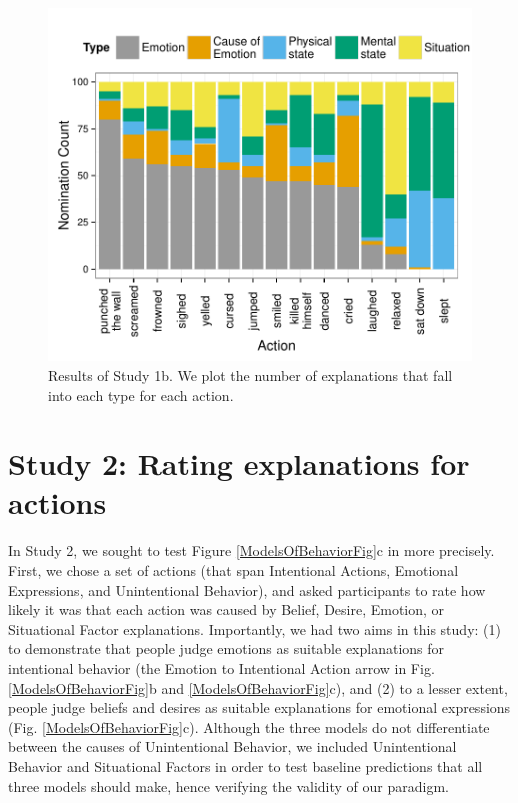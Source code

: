 \documentclass[10pt,letterpaper]{article}
\begin{document}
\begin{figure}[htb!]
\begin{center}\includegraphics[width=1\columnwidth]{images/study1b_codePlot.pdf}\end{center}
\caption{ Results of Study 1b. We plot the number of explanations that fall into each type for each action. }
\label{Study1bResultsFig}
\end{figure}


\section{Study 2: Rating explanations for actions}


In Study 2, we sought to test Figure \ref{ModelsOfBehaviorFig}c in more precisely. First, we chose a set of actions (that span Intentional Actions, Emotional Expressions, and Unintentional Behavior), and asked participants to rate how likely it was that each action was caused by Belief, Desire, Emotion, or Situational Factor explanations. Importantly, we had two aims in this study: (1) to demonstrate that people judge emotions as suitable explanations for intentional behavior (the Emotion to Intentional Action arrow in Fig. \ref{ModelsOfBehaviorFig}b and \ref{ModelsOfBehaviorFig}c), and (2) to a lesser extent, people judge beliefs and desires as suitable explanations for emotional expressions (Fig. \ref{ModelsOfBehaviorFig}c). Although the three models do not differentiate between the causes of Unintentional Behavior, we included Unintentional Behavior and Situational Factors in order to test baseline predictions that all three models should make, hence verifying the validity of our paradigm.
\end{document}
